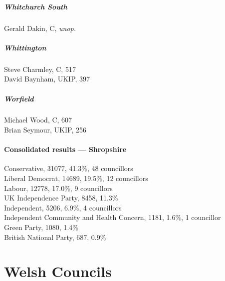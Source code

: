 \documentclass[a4paper,openany,10pt]{book}
\begin{document}
\subsubsection*{Whitchurch South}



Gerald Dakin, C, \emph{unop.}\\


\subsubsection*{Whittington}



Steve Charmley, C, 517\\
David Baynham, UKIP, 397\\


\subsubsection*{Worfield}



Michael Wood, C, 607\\
Brian Seymour, UKIP, 256\\




\subsection*{Consolidated results --- Shropshire}
Conservative, 31077, 41.3\%, 48 councillors\\
Liberal Democrat, 14689, 19.5\%, 12 councillors\\
Labour, 12778, 17.0\%, 9 councillors\\
UK Independence Party, 8458, 11.3\% \\
Independent, 5206, 6.9\%, 4 councillors\\
Independent Community and Health Concern, 1181, 1.6\%, 1 councillor\\
Green Party, 1080, 1.4\% \\
British National Party, 687, 0.9\% \\


\part{Welsh Councils}
\end{document}
